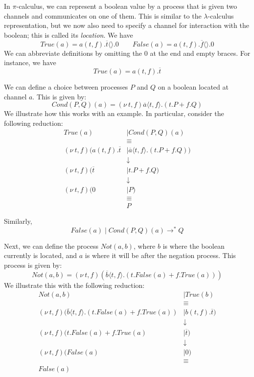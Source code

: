 \documentclass[a4paper, openany]{memoir}
\theoremstyle{definition}
\begin{document}
    In $\pi$-calculus, we can represent a boolean value by a process that is given two channels and communicates on one of them. This is similar to the $\lambda$-calculus representation, but we now also need to specify a channel for interaction with the boolean; this is called its \emph{location}. We have
    \[\textit{True}(a) = a(t, f).\overline{t}\langle\rangle.0 \qquad \textit{False}(a) = a(t, f).\overline{f}\langle\rangle.0\]
    We can abbreviate definitions by omitting the $0$ at the end and empty braces. For instance, we have
    \[\textit{True}(a) = a(t, f).\overline{t}\]

    We can define a choice between processes $P$ and $Q$ on a boolean located at channel $a$. This is given by:
    \[\textit{Cond}(P, Q)(a) = (\nu \ t, f)\overline{a} \langle t, f \rangle.(t.P + f.Q)\]
    We illustrate how this works with an example. In particular, consider the following reduction:
    \begin{align*}
        \textit{True}(a) &\mid \textit{Cond}(P, Q)(a) \\
        &\equiv \\
        (\nu \ t, f) (a(t, f).\overline{t} &\mid \overline{a} \langle t, f \rangle.(t.P + f.Q)) \\
        &\downarrow \\
        (\nu \ t, f) (\overline{t} &\mid t.P + f.Q) \\
        &\downarrow \\
        (\nu \ t, f) (0 &\mid P) \\
        &\equiv \\
        &P
    \end{align*}

    Similarly,
    \[\textit{False}(a) \mid \textit{Cond}(P, Q)(a) \to^* Q\]

    Next, we can define the process $\textit{Not}(a, b)$, where $b$ is where the boolean currently is located, and $a$ is where it will be after the negation process. This process is given by:
    \[\textit{Not}(a, b) = (\nu \ t, f)(\overline{b} \langle t, f \rangle.(
        t.\textit{False}(a) + f.\textit{True}(a)
    ))\]
    We illustrate this with the following reduction:
    \begin{align*}
        \textit{Not}(a, b) &\mid \textit{True}(b) \\
        &\equiv \\
        (\nu \ t, f)(\overline{b} \langle t, f \rangle.(t.\textit{False}(a) + f.\textit{True}(a)) &\mid b(t, f).\overline{t}) \\
        &\downarrow \\
        (\nu \ t, f)(t.\textit{False}(a) + f.\textit{True}(a) &\mid \overline{t} ) \\
        &\downarrow \\
        (\nu \ t, f)(\textit{False}(a) &\mid 0) \\
        &\equiv \\
        \textit{False}(a)
    \end{align*}
\end{document}
